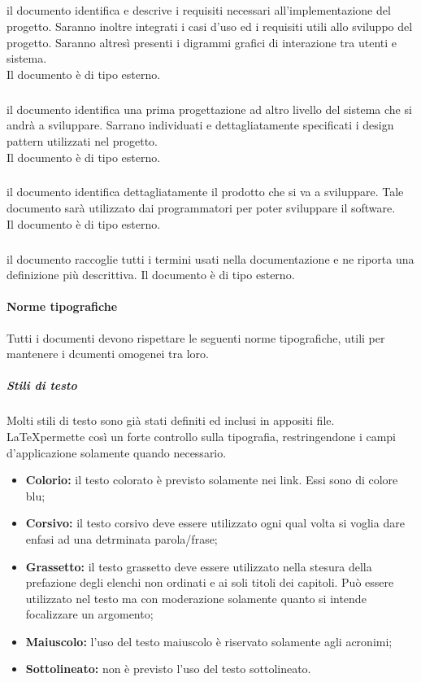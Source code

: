 				\subparagraph{\docNameAdR} il documento identifica e descrive i requisiti necessari all'implementazione del progetto. Saranno inoltre integrati i casi d'uso ed i requisiti utili allo sviluppo del progetto. Saranno altresì presenti i digrammi grafici di interazione tra utenti e sistema.\\
				Il documento è di tipo esterno.

				\subparagraph{\docNameST} il documento identifica una prima progettazione ad altro livello del sistema che si andrà a sviluppare. Sarrano individuati e dettagliatamente specificati i design pattern utilizzati nel progetto.\\
				Il documento è di tipo esterno.

				\subparagraph{\docNameDdP} il documento identifica dettagliatamente il prodotto che si va a sviluppare. Tale documento sarà utilizzato dai programmatori per poter sviluppare il software.\\ 
				Il documento è di tipo esterno.

				\subparagraph{\docNameGlo} il documento raccoglie tutti i termini usati nella documentazione e ne riporta una definizione più descrittiva.  
				Il documento è di tipo esterno.


			\paragraph{Norme tipografiche}
			Tutti i documenti devono rispettare le seguenti norme tipografiche, utili per mantenere i dcumenti omogenei tra loro.
				
				\subparagraph{Stili di testo}
				Molti stili di testo sono già stati definiti ed inclusi in appositi file. \LaTeX permette così un forte controllo sulla tipografia, restringendone i campi d'applicazione solamente quando necessario.  
				\begin{itemize}
				\item \textbf{Colorio:} il testo colorato è previsto solamente nei link. Essi sono di colore blu;
				\item \textbf{Corsivo:} il testo corsivo deve essere utilizzato ogni qual volta si voglia dare enfasi ad una detrminata parola/frase;
				\item \textbf{Grassetto:} il testo grassetto deve essere utilizzato nella stesura della prefazione degli elenchi non ordinati e ai soli titoli dei capitoli. Può essere utilizzato nel testo ma con moderazione solamente quanto si intende focalizzare un argomento;
				\item \textbf{Maiuscolo:} l'uso del testo maiuscolo è riservato solamente agli acronimi;
				\item \textbf{Sottolineato:} non è previsto l'uso del testo sottolineato.
				\end{itemize}

